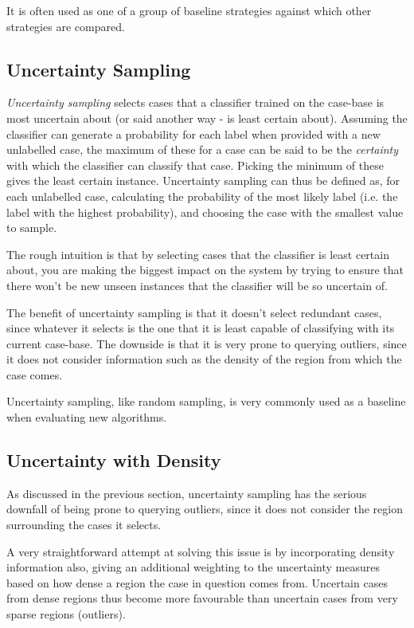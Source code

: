 \documentclass[a4paper,11pt]{report}
\begin{document}
It is often used as one of a group of baseline strategies against which other strategies are compared.

\subsection{Uncertainty Sampling}
\emph{Uncertainty sampling} \citep{Lewis1994} selects cases that a classifier trained on the case-base is most uncertain about (or said another way - is least certain about). Assuming the classifier can generate a probability for each label when provided with a new unlabelled case, the maximum of these for a case can be said to be the \emph{certainty} with which the classifier can classify that case. Picking the minimum of these gives the least certain instance. Uncertainty sampling can thus be defined as, for each unlabelled case, calculating the probability of the most likely label (i.e. the label with the highest probability), and choosing the case with the smallest value to sample.

The rough intuition is that by selecting cases that the classifier is least certain about, you are making the biggest impact on the system by trying to ensure that there won't be new unseen instances that the classifier will be so uncertain of.

The benefit of uncertainty sampling is that it doesn't select redundant cases, since whatever it selects is the one that it is least capable of classifying with its current case-base. The downside is that it is very prone to querying outliers, since it does not consider information such as the density of the region from which the case comes.

Uncertainty sampling, like random sampling, is very commonly used as a baseline when evaluating new algorithms.

\subsection{Uncertainty with Density}
As discussed in the previous section, uncertainty sampling has the serious downfall of being prone to querying outliers, since it does not consider the region surrounding the cases it selects.

A very straightforward attempt at solving this issue is by incorporating density information also, giving an additional weighting to the uncertainty measures based on how dense a region the case in question comes from. Uncertain cases from dense regions thus become more favourable than uncertain cases from very sparse regions (outliers).
\end{document}
